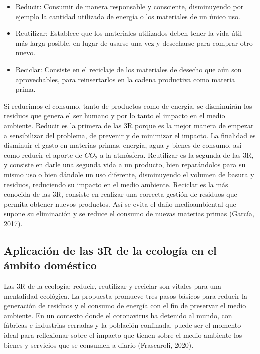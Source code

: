 \begin{itemize}
    \item Reducir: Consumir de manera responsable y consciente, disminuyendo por ejemplo la cantidad utilizada de energía o los materiales de un único uso.
    
    \item Reutilizar: Establece que los materiales utilizados deben tener la vida útil más larga posible, en lugar de usarse una vez y desecharse para comprar otro nuevo.
    
    \item Reciclar: Consiste en el reciclaje de los materiales de desecho que aún son aprovechables, para reinsertarlos en la cadena productiva como materia prima.
\end{itemize}

Si reducimos el consumo, tanto de productos como de energía, se disminuirán los residuos que genera el ser humano y por lo tanto el impacto en el medio ambiente. Reducir es la primera de las 3R porque es la mejor manera de empezar a sensibilizar del problema, de prevenir y de minimizar el impacto. La finalidad es disminuir el gasto en materias primas, energía, agua y bienes de consumo, así como reducir el aporte de $CO_2$ a la atmósfera. Reutilizar es la segunda de las 3R, y consiste en darle una segunda vida a un producto, bien reparándolos para su mismo uso o bien dándole un uso diferente, disminuyendo el volumen de basura y residuos, reduciendo su impacto en el medio ambiente. Reciclar es la más conocida de las 3R, consiste en realizar una correcta gestión de residuos que permita obtener nuevos productos. Así se evita el daño medioambiental que supone su eliminación y se reduce el consumo de nuevas materias primas (García, 2017).

\subsection{Aplicación de las 3R de la ecología en el ámbito doméstico}

Las 3R de la ecología: reducir, reutilizar y reciclar son vitales para una mentalidad ecológica. La propuesta promueve tres pasos básicos para reducir la generación de residuos y el consumo de energía con el fin de preservar el medio ambiente. En un contexto donde el coronavirus ha detenido al mundo, con fábricas e industrias cerradas y la población confinada, puede ser el momento ideal para reflexionar sobre el impacto que tienen sobre el medio ambiente los bienes y servicios que se consumen a diario (Frascaroli, 2020).

